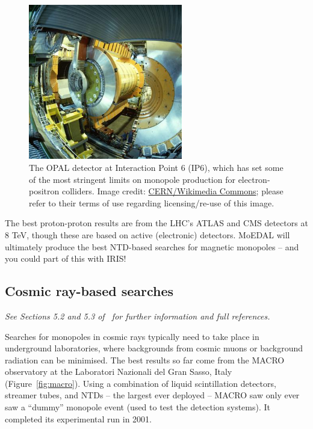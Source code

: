 %
\begin{figure}[htbp]
  \centering
  \includegraphics[width=0.6\textwidth]{assets/images/opal/opal.jpg}
  \caption[The OPAL experiment at CERN's LEP Collider]
  {\label{fig:opal}The \acf{OPAL} detector at Interaction Point 6 (IP6), %
which has set some of the most stringent limits on monopole production for %
electron-positron colliders. %
Image credit: \href{https://commons.wikimedia.org/wiki/File:OPAL.jpg}{CERN/Wikimedia Commons}; %
please refer to their terms of use regarding licensing/re-use of this image.}
\end{figure}
%

The best proton-proton results are from the \ac{LHC}'s \ac{ATLAS} and \ac{CMS}
detectors at 8 \ac{TeV}, though these are based on active (electronic) 
detectors. \ac{MoEDAL} will ultimately produce the best \ac{NTD}-based
searches for magnetic monopoles -- and you could part of this with \ac{IRIS}!

\subsection{Cosmic ray-based searches}
\label{sec:searchescosmicray}
{\em See Sections 5.2 and 5.3 of~\cite{Patrizii2015} for further
information and full references.}

Searches for monopoles in cosmic rays typically need to take place in 
underground laboratories, where backgrounds from cosmic muons or background 
radiation can be minimised.
The best results so far come from the \acf{MACRO} observatory at the
Laboratori Nazionali del Gran Sasso, Italy (Figure~\ref{fig:macro}).
%
Using a combination of liquid scintillation detectors, streamer tubes, 
and \acfp{NTD} -- the largest ever deployed -- \ac{MACRO} saw only
ever saw a ``dummy'' monopole event (used to test the detection systems).
It completed its experimental run in 2001.

